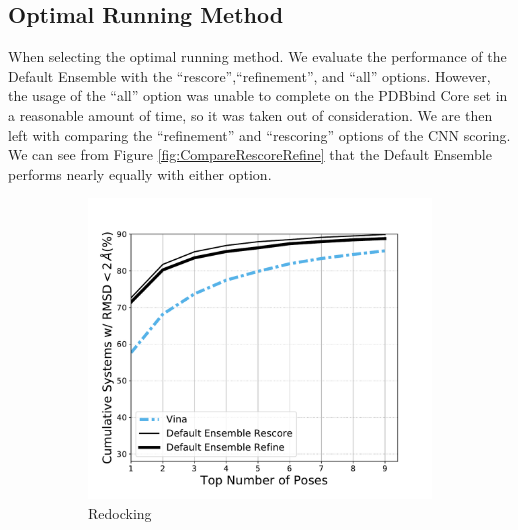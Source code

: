 \documentclass[journal=jcisd8,manuscript=article]{achemso}
\begin{document}
\subsection{Optimal Running Method}
When selecting the optimal running method. We evaluate the performance of the Default Ensemble with the ``rescore'',``refinement'', and ``all'' options. However, the usage of the ``all'' option was unable to complete on the PDBbind Core set in a reasonable amount of time, so it was taken out of consideration. We are then left with comparing the ``refinement'' and ``rescoring'' options of the CNN scoring. We can see from Figure \ref{fig:CompareRescoreRefine} that the Default Ensemble performs nearly equally with either option.

\begin{figure}    
        \begin{subfigure}[b]{0.48\textwidth}    
		\centering
		\includegraphics[width=\textwidth]{figures/redocking/rescore_vs_refine_line.pdf} 
		\caption{Redocking}
		\label{fig:CompareRescoreRefineRedock}
        \end{subfigure}    
        \begin{subfigure}[b]{0.48\textwidth}    
		\centering

\end{subfigure}
\end{figure}
\end{document}
